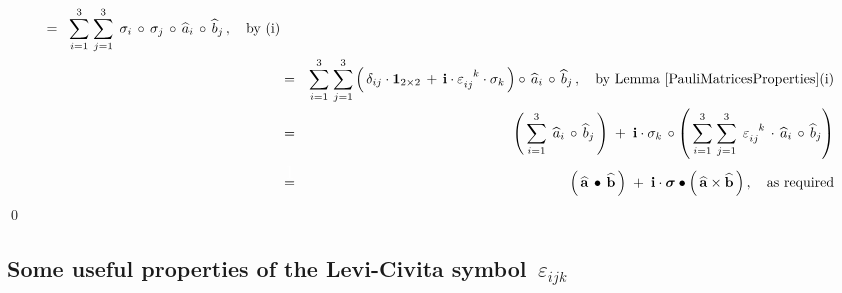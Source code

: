 \begin{enumerate}
\begin{eqnarray*}
    \;\; = \;\;
        \overset{3}{\underset{i=1}{\sum}}\;
        \overset{3}{\underset{j=1}{\sum}}\;\,
        \sigma_{i} \,\circ\, \sigma_{j} \,\circ\, \widehat{a}_{i} \,\circ\, \widehat{b}_{j}\,,
        \quad
        \textnormal{by (i)}
    \\
    & = &
        \overset{3}{\underset{i=1}{\sum}}\;
        \overset{3}{\underset{j=1}{\sum}}
        \left(\,
            \delta_{ij}\cdot\boldsymbol{1}_{2 \times 2}
            \, + \,
            \i\cdot\varepsilon_{ij{\color{white}k}}^{{\color{white}ij}k}\cdot\sigma_{k}
            \,\right)
        \circ\,
        \widehat{a}_{i} \,\circ\, \widehat{b}_{j}\,,
        \quad
        \textnormal{by Lemma \ref{PauliMatricesProperties}(i)}
    \\
    & = &
        \left(\,
            \overset{3}{\underset{i=1}{\sum}}\;\,\widehat{a}_{i}\,\circ\,\widehat{b}_{j}
            \,\right)
        \; + \;
        \i\cdot\sigma_{k}\,\circ
        \left(\,
            \overset{3}{\underset{i=1}{\sum}}\;
            \overset{3}{\underset{j=1}{\sum}}\;\,
            \varepsilon_{ij{\color{white}k}}^{{\color{white}ij}k}
            \,\cdot\,
            \widehat{a}_{i} \,\circ\, \widehat{b}_{j}
            \right)
    \\
    & \overset{{\color{white}\textnormal{\Large 1}}}{=} &
        \left(\,
            \widehat{\mathbf{a}} \,\bullet\, \widehat{\mathbf{b}}
            \,\right)
        \; + \;
        \i\cdot
        \boldsymbol{\sigma}
        \bullet
        \left(\,
            \widehat{\mathbf{a}} \times \widehat{\mathbf{b}}
            \,\right),
    \quad
    \textnormal{as required}
    \end{eqnarray*}
    \qed
\end{enumerate}


\clearpage
\subsection{Some useful properties of the Levi-Civita symbol \,$\varepsilon_{ijk}$}

